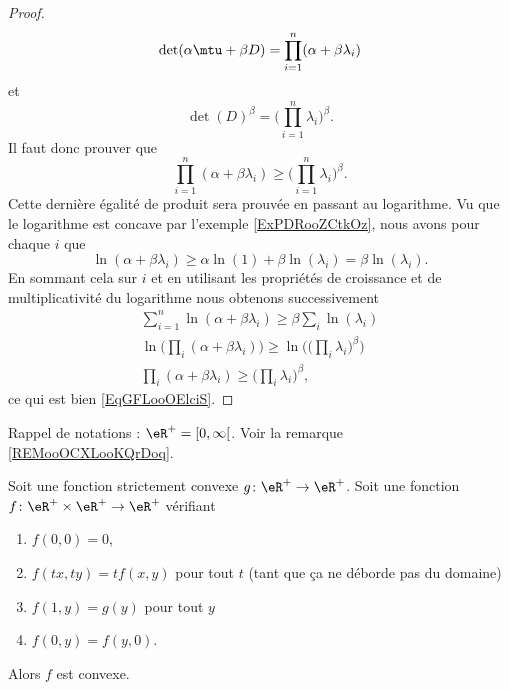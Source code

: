 \begin{proof}
    \begin{equation}
        \det(\alpha\mtu+\beta D)=\prod_{i=1}^n(\alpha+\beta\lambda_i)
    \end{equation}
    et 
    \begin{equation}
        \det(D)^{\beta}=\big( \prod_{i=1}^{n}\lambda_i \big)^{\beta}.
    \end{equation}
    Il faut donc prouver que
    \begin{equation}\label{EqGFLooOElciS}    
        \prod_{i=1}^n(\alpha+\beta\lambda_i)\geq \big( \prod_{i=1}^n\lambda_i \big)^{\beta}.
    \end{equation}
    Cette dernière égalité de produit sera prouvée en passant au logarithme. Vu que le logarithme est concave par l'exemple \ref{ExPDRooZCtkOz}, nous avons pour chaque \( i\) que
    \begin{equation}
        \ln(\alpha+\beta\lambda_i)\geq \alpha\ln(1)+\beta\ln(\lambda_i)=\beta\ln(\lambda_i).
    \end{equation}
    En sommant cela sur \( i\) et en utilisant les propriétés de croissance et de multiplicativité du logarithme nous obtenons successivement
    \begin{subequations}
        \begin{align}
            \sum_{i=1}^n\ln(\alpha+\beta\lambda_i)\geq \beta\sum_i\ln(\lambda_i)\\
            \ln\big( \prod_i(\alpha+\beta\lambda_i) \big)\geq\ln\Big( \big( \prod_i\lambda_i \big)^{\beta} \Big)\\
            \prod_i(\alpha+\beta\lambda_i)\geq\big( \prod_i\lambda_i \big)^{\beta},
        \end{align}
    \end{subequations}
    ce qui est bien \eqref{EqGFLooOElciS}.
\end{proof}

Rappel de notations : \( \eR^+=\mathopen[ 0 , \infty \mathclose[\). Voir la remarque \ref{REMooOCXLooKQrDoq}.
\begin{lemma}
    Soit une fonction strictement convexe \( g\colon \eR^+\to \eR^+\). Soit une fonction \( f\colon \eR^+\times \eR^+\to \eR^+\) vérifiant
    \begin{enumerate}
        \item
            \( f(0,0)=0\),
        \item
            \( f(tx,ty)=tf(x,y)\) pour tout \( t\) (tant que ça ne déborde pas du domaine)
        \item
            \( f(1,y)=g(y)\) pour tout \( y\)
        \item
            \( f(0,y)=f(y,0)\).
    \end{enumerate}
    Alors \( f\) est convexe.
\end{lemma}

